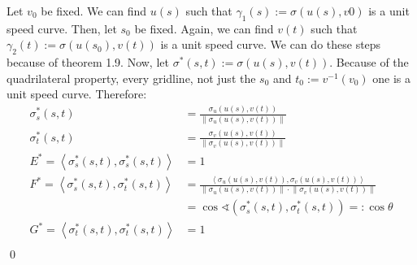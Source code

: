 \documentclass[a4paper,11pt,notitlepage,fullpage]{article}
\begin{document}
\begin{enumerate}
Let $v_0$ be fixed. We can find $u\left(s\right)$ such that $\gamma_1\left(s\right) := \sigma\left(u\left(s\right), v0\right)$ is a unit speed curve. Then, let $s_0$ be fixed. Again, we can find $v\left(t\right)$ such that $\gamma_2\left(t\right) := \sigma\left(u\left(s_0\right), v\left(t\right)\right)$ is a unit speed curve. We can do these steps because of theorem 1.9. Now, let $\sigma^*\left(s,t\right) := \sigma\left(u\left(s\right), v\left(t\right)\right)$. Because of the quadrilateral property, every gridline, not just the $s_0$ and $t_0 := v^{-1}\left(v_0\right)$ one is a unit speed curve. Therefore:
\begin{align*}
\sigma^*_s\left(s,t\right) &= \frac{\sigma_u\left(u\left(s\right), v\left(t\right)\right)}{\left\|\sigma_u\left(u\left(s\right), v\left(t\right)\right)\right\|} \\
\sigma^*_t\left(s,t\right) &= \frac{\sigma_v\left(u\left(s\right), v\left(t\right)\right)}{\left\|\sigma_v\left(u\left(s\right), v\left(t\right)\right)\right\|} \\
E^* = \left\langle\sigma^*_s\left(s,t\right), \sigma^*_s\left(s,t\right)\right\rangle &= 1 \\
F^* = \left\langle\sigma^*_s\left(s,t\right), \sigma^*_t\left(s,t\right)\right\rangle &= \frac{\left\langle\sigma_u\left(u\left(s\right), v\left(t\right)\right), \sigma_v\left(u\left(s\right), v\left(t\right)\right)\right\rangle}{\left\|\sigma_u\left(u\left(s\right), v\left(t\right)\right)\right\|\cdot\left\|\sigma_v\left(u\left(s\right), v\left(t\right)\right)\right\|} \\
&= \cos \sphericalangle\left(\sigma^*_s\left(s,t\right), \sigma^*_t\left(s,t\right)\right) =: \cos \theta\\
G^* = \left\langle\sigma^*_t\left(s,t\right), \sigma^*_t\left(s,t\right)\right\rangle &= 1 \\
\end{align*}
\qed


\end{enumerate}
\end{document}
